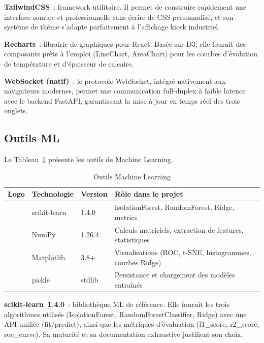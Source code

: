 \textbf{TailwindCSS}~: framework utilitaire. Il permet de construire rapidement une interface sombre et professionnelle sans écrire de CSS personnalisé, et son système de thème s'adapte parfaitement à l'affichage kiosk industriel.

\textbf{Recharts}~: librairie de graphiques pour React. Basée sur D3, elle fournit des composants prêts à l'emploi (LineChart, AreaChart) pour les courbes d'évolution de température et d'épaisseur de calcaire.

\textbf{WebSocket (natif)}~: le protocole WebSocket, intégré nativement aux navigateurs modernes, permet une communication full-duplex à faible latence avec le backend FastAPI, garantissant la mise à jour en temps réel des trois onglets.

\subsection{Outils ML}

Le Tableau~\ref{tab:stack_ml} présente les outils de Machine Learning.

\begin{table}[htbp]
\centering
\caption{Outils Machine Learning}
\label{tab:stack_ml}
\begin{tabular}{c p{} p{} p{}}
\toprule
\textbf{Logo} & \textbf{Technologie} & \textbf{Version} & \textbf{Rôle dans le projet} \\
\midrule
\fbox{\parbox[c][0.6cm][c]{0.6cm}{\centering\tiny [sk]}} & scikit-learn & 1.4.0 & IsolationForest, RandomForest, Ridge, metrics \\
\fbox{\parbox[c][0.6cm][c]{0.6cm}{\centering\tiny [np]}} & NumPy & 1.26.4 & Calculs matriciels, extraction de features, statistiques \\
\fbox{\parbox[c][0.6cm][c]{0.6cm}{\centering\tiny [mp]}} & Matplotlib & 3.8+ & Visualisations (ROC, t-SNE, histogrammes, courbes Ridge) \\
\fbox{\parbox[c][0.6cm][c]{0.6cm}{\centering\tiny [pk]}} & pickle & stdlib & Persistance et chargement des modèles entraînés \\
\bottomrule
\end{tabular}
\end{table}

\textbf{scikit-learn~1.4.0}~: bibliothèque ML de référence. Elle fournit les trois algorithmes utilisés (IsolationForest, RandomForestClassifier, Ridge) avec une API unifiée (fit/predict), ainsi que les métriques d'évaluation (f1\_score, r2\_score, roc\_curve). Sa maturité et sa documentation exhaustive justifient son choix.

